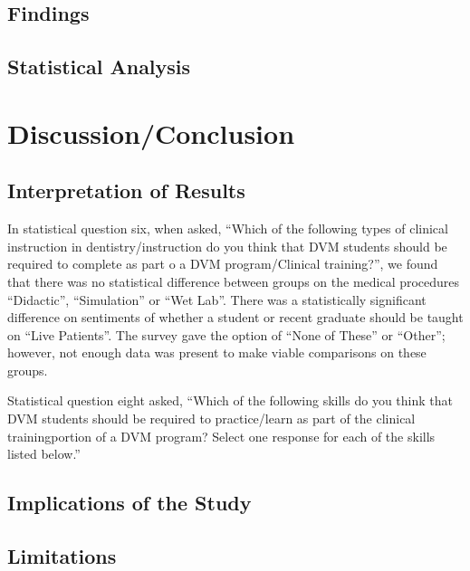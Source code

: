 \documentclass[
  11pt,
  letterpaper,
  DIV=11,
  numbers=noendperiod]{scrartcl}
\numberwithin{figure}{section}
\begin{document}
\hypertarget{findings}{%
\subsection{Findings}\label{findings}}

\hypertarget{statistical-analysis}{%
\subsection{Statistical Analysis}\label{statistical-analysis}}

\hypertarget{discussionconclusion}{%
\section{Discussion/Conclusion}\label{discussionconclusion}}

\hypertarget{interpretation-of-results}{%
\subsection{Interpretation of Results}\label{interpretation-of-results}}

In statistical question six, when asked, ``Which of the following types
of clinical instruction in dentistry/instruction do you think that DVM
students should be required to complete as part o a DVM program/Clinical
training?'', we found that there was no statistical difference between
groups on the medical procedures ``Didactic'', ``Simulation'' or ``Wet
Lab''. There was a statistically significant difference on sentiments of
whether a student or recent graduate should be taught on ``Live
Patients''. The survey gave the option of ``None of These'' or
``Other''; however, not enough data was present to make viable
comparisons on these groups.

Statistical question eight asked, ``Which of the following skills do you
think that DVM students should be required to practice/learn as part of
the clinical trainingportion of a DVM program? Select one response for
each of the skills listed below.''

\hypertarget{implications-of-the-study}{%
\subsection{Implications of the Study}\label{implications-of-the-study}}

\hypertarget{limitations}{%
\subsection{Limitations}\label{limitations}}
\end{document}
